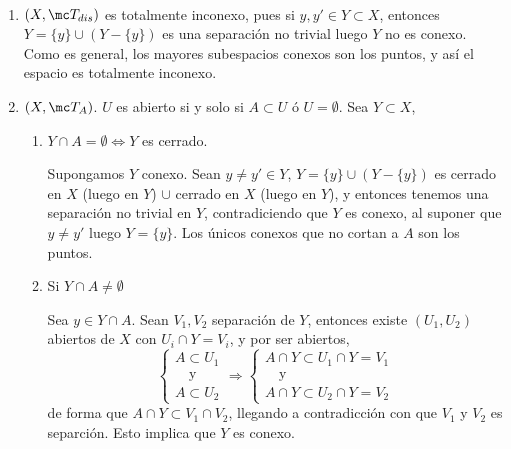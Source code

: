 \begin{ejems} \,
\begin{enumerate}
    \item $(X, \mc T_{dis})$ es totalmente inconexo, pues si $y,y' \in Y\subset X$, entonces $Y = \{y\} \cup (Y-\{y\})$ es una separaci\'on no trivial luego $Y$ no es conexo. Como es general, los mayores subespacios conexos son los puntos, y as\'i el espacio es totalmente inconexo. 
    \item $(X, \mc T_A)$. $U$ es abierto si y solo si $A \subset U$ \'o $U=\emptyset$. Sea $Y \subset X$, 
    \begin{enumerate}
        \item $Y \cap A = \emptyset \iff Y$ es cerrado.
        
        Supongamos $Y$ conexo. Sean $y\neq y' \in Y$, $Y = \{y\} \cup (Y-\{y\})$ es cerrado en $X$ (luego en $Y$) $\cup$ cerrado en $X$ (luego en $Y$), y entonces tenemos una separaci\'on no trivial en $Y$, contradiciendo que $Y$ es conexo, al suponer que $y\neq y'$ luego $Y=\{y\}$. Los \'unicos conexos que no cortan a $A$ son los puntos.
        \item Si $Y\cap A \neq \emptyset$
        
        Sea $y\in Y\cap A$. Sean $V_1,V_2$ separaci\'on de $Y$, entonces existe $(U_1,U_2)$ abiertos de $X$ con $U_i \cap Y = V_i$, y por ser abiertos, 
        $$\begin{cases} A\subset U_1 \\[-3mm] \quad \text{y} \\[-3mm] A\subset U_2  \end{cases} 
        \Rightarrow 
        \begin{cases}
            A\cap Y \subset U_1 \cap Y=V_1 \\[-3mm]  \quad \text{y} \\[-3mm] A\cap Y \subset U_2 \cap Y = V_2
        \end{cases}$$ de forma que $A\cap Y\subset V_1 \cap V_2$,  llegando a contradicci\'on con que $V_1$ y $V_2$ es separci\'on. Esto implica que $Y$ es conexo. 


\end{enumerate}
\end{enumerate}
\end{ejems}
